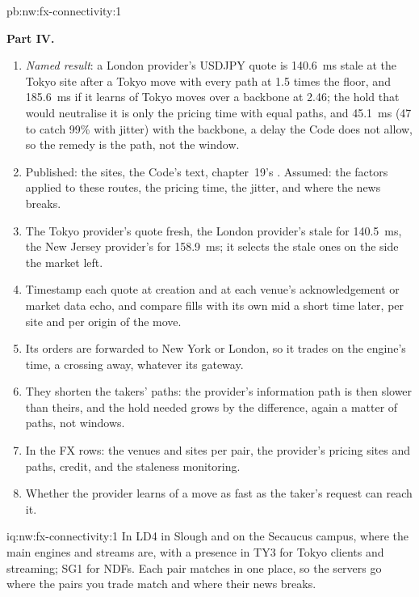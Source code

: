 \begin{solution}{pb:nw:fx-connectivity:1}
\begin{enumerate}[resume]
\end{enumerate}
\textbf{Part IV.}
\begin{enumerate}[resume]
\item \emph{Named result}: a London provider's USDJPY quote is \qty{140.6}{\milli\second} stale at the Tokyo site after a Tokyo move with
  every path at 1.5 times the floor, and \qty{185.6}{\milli\second} if it learns of Tokyo moves over a backbone at 2.46; the hold that would
  neutralise it is only the pricing time with equal paths, and \qty{45.1}{\milli\second} (47 to catch 99\% with jitter) with the backbone, a
  delay the Code does not allow, so the remedy is the path, not the window.
\item Published: the sites, the Code's text, chapter~19's . Assumed: the factors applied to these routes, the pricing time, the
  jitter, and where the news breaks.
\item The Tokyo provider's quote fresh, the London provider's stale for \qty{140.5}{\milli\second}, the New Jersey provider's for
  \qty{158.9}{\milli\second}; it selects the stale ones on the side the market left.
\item Timestamp each quote at creation and at each venue's acknowledgement or market data echo, and compare fills with its own mid a short
  time later, per site and per origin of the move.
\item Its orders are forwarded to New York or London, so it trades on the engine's time, a crossing away, whatever its gateway.
\item They shorten the takers' paths: the provider's information path is then slower than theirs, and the hold needed grows by the
  difference, again a matter of paths, not windows.
\item In the FX rows: the venues and sites per pair, the provider's pricing sites and paths, credit, and the staleness monitoring.
\item Whether the provider learns of a move as fast as the taker's request can reach it.
\end{enumerate}
\end{solution}

\begin{solution}{iq:nw:fx-connectivity:1}
In LD4 in Slough and on the Secaucus campus, where the main engines and streams are, with a presence in TY3 for Tokyo clients and
streaming; SG1 for NDFs. Each pair matches in one place, so the servers go where the pairs you trade match and where their news breaks.
\end{solution}

